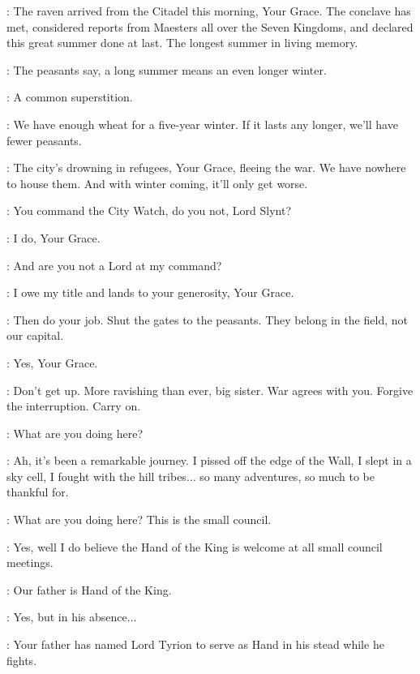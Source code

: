 
\PYCELLE: The raven arrived from the Citadel this morning, Your Grace. The conclave has met, considered reports from Maesters all over the Seven Kingdoms, and declared this great summer done at last. The longest summer in living memory.

\VARYS: The peasants say, a long summer means an even longer winter.

\PYCELLE: A common superstition.

\LITTLEFINGER: We have enough wheat for a five-year winter. If it lasts any longer, we'll have fewer peasants.

\JANOSSLYNT: The city's drowning in refugees, Your Grace, fleeing the war. We have nowhere to house them. And with winter coming, it'll only get worse.

\CERSEI: You command the City Watch, do you not, Lord Slynt?

\JANOSSLYNT: I do, Your Grace.

\CERSEI: And are you not a Lord at my command?

\JANOSSLYNT: I owe my title and lands to your generosity, Your Grace.

\CERSEI: Then do your job. Shut the gates to the peasants. They belong in the field, not our capital.

\JANOSSLYNT: Yes, Your Grace.


\TYRION: Don't get up. More ravishing than ever, big sister. War agrees with you. Forgive the interruption. Carry on.

\CERSEI: What are you doing here?

\TYRION: Ah, it's been a remarkable journey. I pissed off the edge of the Wall, I slept in a sky cell, I fought with the hill tribes$\ldots$ so many adventures, so much to be thankful for.

\CERSEI: What are you doing here? This is the small council.

\TYRION: Yes, well I do believe the Hand of the King is welcome at all small council meetings.

\CERSEI: Our father is Hand of the King.

\TYRION: Yes, but in his absence$\ldots$ 

\VARYS: Your father has named Lord Tyrion to serve as Hand in his stead while he fights.


